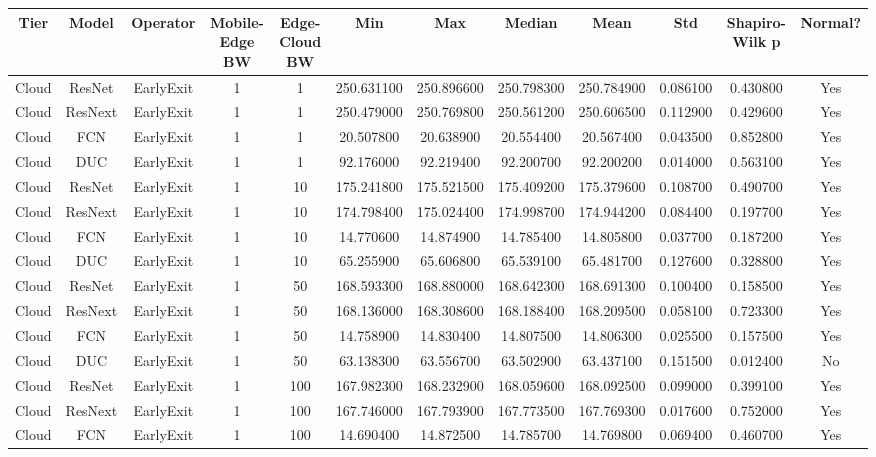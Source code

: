 \begin{tabular}{|c||c||c||c||c||c||c||c||c||c||c||c|}
\toprule
Tier & Model & Operator & Mobile-Edge BW & Edge-Cloud BW & Min & Max & Median & Mean & Std & Shapiro-Wilk p & Normal? \\
\midrule
Cloud & ResNet & EarlyExit & 1 & 1 & 250.631100 & 250.896600 & 250.798300 & 250.784900 & 0.086100 & 0.430800 & Yes \\
Cloud & ResNext & EarlyExit & 1 & 1 & 250.479000 & 250.769800 & 250.561200 & 250.606500 & 0.112900 & 0.429600 & Yes \\
Cloud & FCN & EarlyExit & 1 & 1 & 20.507800 & 20.638900 & 20.554400 & 20.567400 & 0.043500 & 0.852800 & Yes \\
Cloud & DUC & EarlyExit & 1 & 1 & 92.176000 & 92.219400 & 92.200700 & 92.200200 & 0.014000 & 0.563100 & Yes \\
Cloud & ResNet & EarlyExit & 1 & 10 & 175.241800 & 175.521500 & 175.409200 & 175.379600 & 0.108700 & 0.490700 & Yes \\
Cloud & ResNext & EarlyExit & 1 & 10 & 174.798400 & 175.024400 & 174.998700 & 174.944200 & 0.084400 & 0.197700 & Yes \\
Cloud & FCN & EarlyExit & 1 & 10 & 14.770600 & 14.874900 & 14.785400 & 14.805800 & 0.037700 & 0.187200 & Yes \\
Cloud & DUC & EarlyExit & 1 & 10 & 65.255900 & 65.606800 & 65.539100 & 65.481700 & 0.127600 & 0.328800 & Yes \\
Cloud & ResNet & EarlyExit & 1 & 50 & 168.593300 & 168.880000 & 168.642300 & 168.691300 & 0.100400 & 0.158500 & Yes \\
Cloud & ResNext & EarlyExit & 1 & 50 & 168.136000 & 168.308600 & 168.188400 & 168.209500 & 0.058100 & 0.723300 & Yes \\
Cloud & FCN & EarlyExit & 1 & 50 & 14.758900 & 14.830400 & 14.807500 & 14.806300 & 0.025500 & 0.157500 & Yes \\
Cloud & DUC & EarlyExit & 1 & 50 & 63.138300 & 63.556700 & 63.502900 & 63.437100 & 0.151500 & 0.012400 & No \\
Cloud & ResNet & EarlyExit & 1 & 100 & 167.982300 & 168.232900 & 168.059600 & 168.092500 & 0.099000 & 0.399100 & Yes \\
Cloud & ResNext & EarlyExit & 1 & 100 & 167.746000 & 167.793900 & 167.773500 & 167.769300 & 0.017600 & 0.752000 & Yes \\
Cloud & FCN & EarlyExit & 1 & 100 & 14.690400 & 14.872500 & 14.785700 & 14.769800 & 0.069400 & 0.460700 & Yes \\

\end{tabular}
